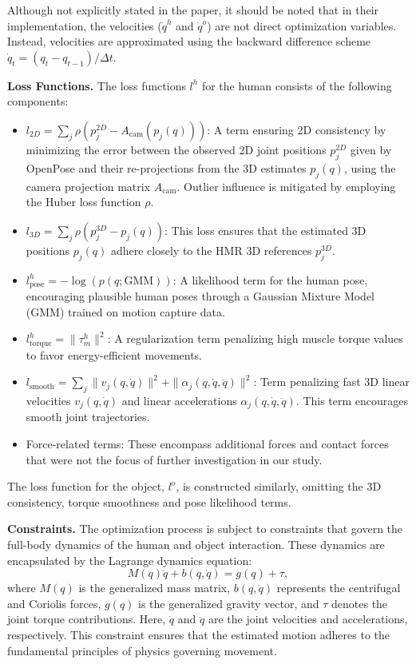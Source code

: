 Although not explicitly stated in the paper, it should be noted that in their implementation, the velocities (\(\dot{q}^h\) and \(\dot{q}^o\))
are not direct optimization variables. Instead, velocities are approximated using the backward difference scheme 
\(\dot{q}_t = (q_t - q_{t - 1}) / \Delta t\).

\noindent\textbf{Loss Functions.} The loss functions \(l^h\) for the human consists of the following components:

\begin{itemize}
    \item 
        \(l_{2D} = \sum_j \rho\left(p_j^{2D} - A_{\text{cam}}\left(p_j(q)\right)\right)\): A term ensuring 2D consistency by minimizing the error 
        between the observed 2D joint positions \(p_j^{2D}\) given by OpenPose and 
        their re-projections from the 3D estimates \(p_j(q)\), using the camera projection matrix \(A_{\text{cam}}\). Outlier influence is mitigated 
        by employing the Huber loss function \(\rho\).
    \item 
        \(l_{3D} = \sum_j \rho\left(p_j^{3D} -p_j(q)\right)\): This loss ensures that the estimated 3D positions \(p_j(q)\) adhere closely to the
         HMR 3D references \(p_j^{3D}\).
    \item 
        \(l_{\text{pose}}^h = -\log\left(p\left(q;\text{GMM}\right)\right)\): A likelihood term for the human pose, encouraging plausible human 
        poses through a Gaussian Mixture Model (GMM) trained on motion capture data.
    \item
        \(l_{\text{torque}}^h = \|\tau_m^h\|^2\): A regularization term penalizing high muscle torque values to favor energy-efficient movements.
    \item 
        \(l_{\text{smooth}} = \sum_{j} \|v_j(q, \dot{q})\|^2 + \|\alpha_j(q, \dot{q}, \ddot{q})\|^2\): Term penalizing fast 3D linear velocities 
        \(v_j(q, \dot{q})\) and linear accelerations \(\alpha_j(q, \dot{q}, \ddot{q})\). This term encourages smooth joint trajectories.
    \item
        Force-related terms: These encompass additional forces and contact forces that were not the focus of further investigation in our 
        study.
\end{itemize}

The loss function for the object, \(l^o\), is constructed similarly, omitting the 3D consistency, torque smoothness and pose likelihood terms.

\noindent\textbf{Constraints.} The optimization process is subject to constraints that govern the full-body dynamics of the human and object 
interaction. These dynamics are encapsulated by the Lagrange dynamics equation:
\[
M(q)\ddot{q} + b(q, \dot{q}) = g(q) + \tau,
\]
where \( M(q) \) is the generalized mass matrix, \( b(q, \dot{q}) \) represents the centrifugal and Coriolis forces, \( g(q) \) is the 
generalized gravity vector, and \( \tau \) denotes the joint torque contributions. Here, \( \dot{q} \) and \( \ddot{q} \) are the joint 
velocities and accelerations, respectively. This constraint ensures that the estimated motion adheres to the fundamental principles of physics 
governing movement.

